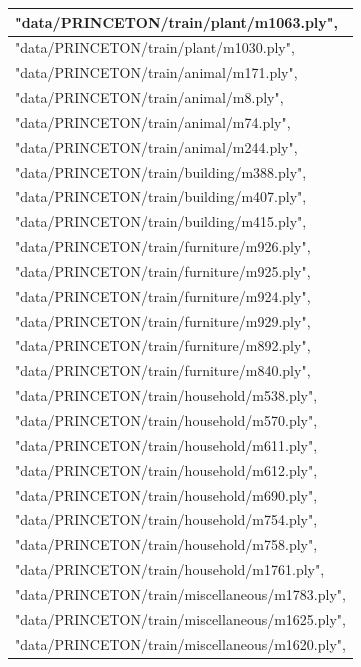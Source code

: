 \begin{table}[ht]
\centering
\begin{tabular}{|l|}
\hline
"data/PRINCETON/train/plant/m1063.ply",         \\ \hline
"data/PRINCETON/train/plant/m1030.ply",         \\ \hline
"data/PRINCETON/train/animal/m171.ply",         \\ \hline
"data/PRINCETON/train/animal/m8.ply",           \\ \hline
"data/PRINCETON/train/animal/m74.ply",          \\ \hline
"data/PRINCETON/train/animal/m244.ply",         \\ \hline
"data/PRINCETON/train/building/m388.ply",       \\ \hline
"data/PRINCETON/train/building/m407.ply",       \\ \hline
"data/PRINCETON/train/building/m415.ply",       \\ \hline
"data/PRINCETON/train/furniture/m926.ply",      \\ \hline
"data/PRINCETON/train/furniture/m925.ply",      \\ \hline
"data/PRINCETON/train/furniture/m924.ply",      \\ \hline
"data/PRINCETON/train/furniture/m929.ply",      \\ \hline
"data/PRINCETON/train/furniture/m892.ply",      \\ \hline
"data/PRINCETON/train/furniture/m840.ply",      \\ \hline
"data/PRINCETON/train/household/m538.ply",      \\ \hline
"data/PRINCETON/train/household/m570.ply",      \\ \hline
"data/PRINCETON/train/household/m611.ply",      \\ \hline
"data/PRINCETON/train/household/m612.ply",      \\ \hline
"data/PRINCETON/train/household/m690.ply",      \\ \hline
"data/PRINCETON/train/household/m754.ply",      \\ \hline
"data/PRINCETON/train/household/m758.ply",      \\ \hline
"data/PRINCETON/train/household/m1761.ply",     \\ \hline
"data/PRINCETON/train/miscellaneous/m1783.ply", \\ \hline
"data/PRINCETON/train/miscellaneous/m1625.ply", \\ \hline
"data/PRINCETON/train/miscellaneous/m1620.ply", \\ \hline

\end{tabular}
\end{table}
